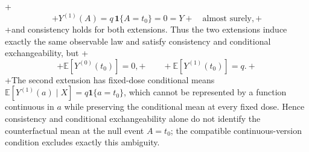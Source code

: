 +\[
+Y^{(1)}(A)=q\,\mathbf 1\{A=t_0\}=0=Y
+\quad\text{almost surely},
+\]
+and consistency holds for both extensions. Thus the two extensions induce exactly the same observable law and satisfy consistency and conditional exchangeability, but
+\[
+\mathbb E[Y^{(0)}(t_0)]=0,
+\qquad
+\mathbb E[Y^{(1)}(t_0)]=q.
+\]
+The second extension has fixed-dose conditional means \(\mathbb E[Y^{(1)}(a)\mid X]=q\mathbf 1\{a=t_0\}\), which cannot be represented by a function continuous in \(a\) while preserving the conditional mean at every fixed dose. Hence consistency and conditional exchangeability alone do not identify the counterfactual mean at the null event \(A=t_0\); the compatible continuous-version condition excludes exactly this ambiguity.